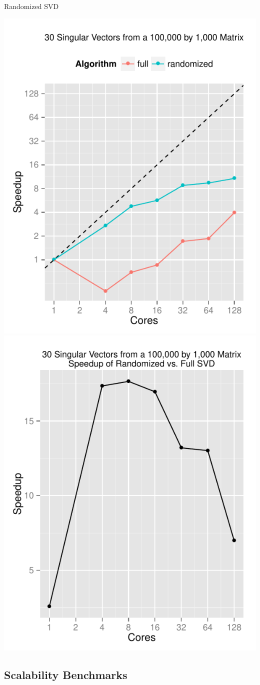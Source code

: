 \begin{frame}
  \begin{block}{Randomized SVD}
    \begin{center}
      \includegraphics[width=.45\textwidth]{../common/pics/randSVDspeedup}
      \hfill
      \includegraphics[width=.45\textwidth]{../common/pics/randSpeedupSVD}
    \end{center}
  \end{block}
\end{frame}

\subsection{Scalability Benchmarks}

